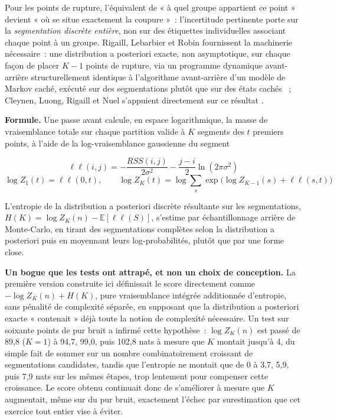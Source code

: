 \documentclass[11pt]{article}
\begin{document}
Pour les points de rupture, l'équivalent de « à quel groupe appartient ce
point » devient « où se situe exactement la coupure »~: l'incertitude
pertinente porte sur la \emph{segmentation discrète entière}, non sur des
étiquettes individuelles associant chaque point à un groupe. Rigaill,
Lebarbier et Robin fournissent la machinerie nécessaire~: une distribution
a posteriori exacte, non asymptotique, sur chaque façon de placer $K-1$
points de rupture, via un programme dynamique avant-arrière
structurellement identique à l'algorithme avant-arrière d'un modèle de
Markov caché, exécuté sur des segmentations plutôt que sur des états
cachés \citeyearpar{rigaill2012}~; Cleynen, Luong, Rigaill et Nuel
s'appuient directement sur ce résultat \citeyearpar{cleynen2013}.

\textbf{Formule.} Une passe avant calcule, en espace logarithmique, la
masse de vraisemblance totale sur chaque partition valide à $K$ segments
des $t$ premiers points, à l'aide de la log-vraisemblance gaussienne du
segment

\begin{equation}
\ell\ell(i, j) = -\frac{RSS(i, j)}{2\sigma^2} - \frac{j - i}{2} \ln(2\pi\sigma^2)
\end{equation}
\begin{equation}
\log Z_1(t) = \ell\ell(0, t), \qquad \log Z_K(t) = \log \sum_{s} \exp\!\Big( \log Z_{K-1}(s) + \ell\ell(s, t) \Big)
\end{equation}

L'entropie de la distribution a posteriori discrète résultante sur les
segmentations, $H(K) = \log Z_K(n) - \mathbb{E}[\ell\ell(S)]$, s'estime par
échantillonnage arrière de Monte-Carlo, en tirant des segmentations
complètes selon la distribution a posteriori puis en moyennant leurs
log-probabilités, plutôt que par une forme close.

\textbf{Un bogue que les tests ont attrapé, et non un choix de conception.}
La première version construite ici définissait le score directement comme
$-\log Z_K(n) + H(K)$, pure vraisemblance intégrée additionnée d'entropie,
sans pénalité de complexité séparée, en supposant que la distribution a
posteriori exacte « contenait » déjà toute la notion de complexité
nécessaire. Un test sur soixante points de pur bruit a infirmé cette
hypothèse~: $\log Z_K(n)$ est passé de 89,8 ($K=1$) à 94,7, 99,0, puis
102,8 nats à mesure que $K$ montait jusqu'à 4, du simple fait de sommer sur
un nombre combinatoirement croissant de segmentations candidates, tandis
que l'entropie ne montait que de 0 à 3,7, 5,9, puis 7,9 nats sur les mêmes
étapes, trop lentement pour compenser cette croissance. Le score obtenu
continuait donc de s'améliorer à mesure que $K$ augmentait, même sur du pur
bruit, exactement l'échec par surestimation que cet exercice tout entier
vise à éviter.
\end{document}
